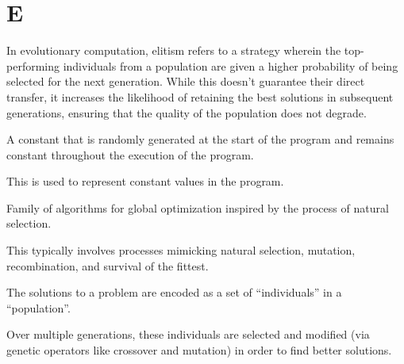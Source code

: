 \section*{E}
  \begin{definition}[Elitism]
    \label{def:elitism}
    In evolutionary computation, elitism refers to a strategy wherein the 
    top-performing individuals from a population are given a higher probability 
    of being selected for the next generation.
    While this doesn't guarantee their direct transfer, it increases the 
    likelihood of retaining the best solutions in subsequent generations, 
    ensuring that the quality of the population does not degrade.
  \end{definition}

  \begin{definition}
  \label{def:ephemeral_constant}
    A constant that is randomly generated at the start of the program and 
    remains constant throughout the execution of the program.

    This is used to represent constant values in the program.
  \end{definition}

  \begin{definition}
  \label{def:evolutionary_computation}
    Family of algorithms for global optimization inspired by the process of natural selection.

    This typically involves processes mimicking natural selection, mutation, recombination, and 
    survival of the fittest.

    The solutions to a problem are encoded as a set of \enquote{individuals} in a 
    \enquote{population}.

    Over multiple generations, these individuals are selected and modified (via genetic operators 
    like crossover and mutation) in order to find better solutions.
  \end{definition}

